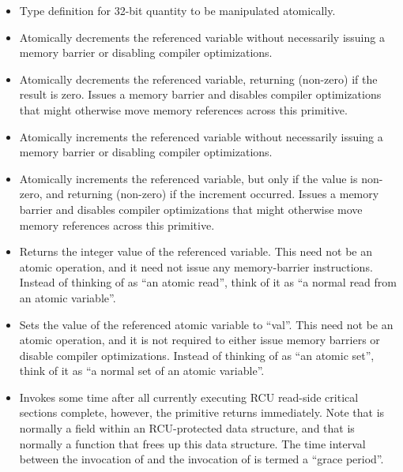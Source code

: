 \begin{itemize}
\item	{}
	Type definition for 32-bit quantity to be manipulated atomically.
\item	{}
	Atomically decrements the referenced variable without necessarily
	issuing a memory barrier or disabling compiler optimizations.
\item	{}
	Atomically decrements the referenced variable, returning
	 (non-zero) if the result is zero.
	Issues a memory barrier and disables compiler optimizations that
	might otherwise move memory references across this primitive.
\item	{}
	Atomically increments the referenced variable without necessarily
	issuing a memory barrier or disabling compiler optimizations.
\item	{}
	Atomically increments the referenced variable, but only if the
	value is non-zero, and returning  (non-zero) if the
	increment occurred.
	Issues a memory barrier and disables compiler optimizations that
	might otherwise move memory references across this primitive.
\item	{}
	Returns the integer value of the referenced variable.
	This need not be an atomic operation, and it need not issue any
	memory-barrier instructions.
	Instead of thinking of as ``an atomic read'', think of it as
	``a normal read from an atomic variable''.
\item	{}
	Sets the value of the referenced atomic variable to ``val''.
	This need not be an atomic operation, and it is not required
	to either issue memory
	barriers or disable compiler optimizations.
	Instead of thinking of as ``an atomic set'', think of it as
	``a normal set of an atomic variable''.
\item	{}
	Invokes  some time after all currently executing RCU
	read-side critical sections complete, however, the 
	primitive returns immediately.
	Note that  is normally a field within an RCU-protected
	data structure, and that  is normally a function that
	frees up this data structure.
	The time interval between the invocation of  and
	the invocation of  is termed a ``grace period''.

\end{itemize}
